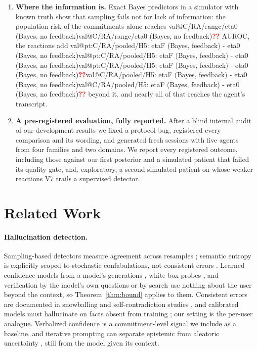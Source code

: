 \documentclass[10pt,a4paper,twocolumn]{article}
\makeatletter
\newcommand{\val}[1]{\ifcsname val@#1\endcsname\csname val@#1\endcsname\else\textcolor{red}{\textbf{??}}\fi}
\newcommand{\pt}[1]{\ifcsname val@pt:#1\endcsname\val{pt:#1}\else\val{#1}\fi}
\newif\iffinal \finaltrue
\newcommand{\chk}[1]{\iffinal#1\else\textcolor{blue}{#1}\fi}
\makeatother
\begin{document}
\begin{enumerate}
and \pt{PC/user_dependent/pooled/auroc_disagreement} for resample
disagreement. \chk{After the registered V6 picker failed, an amendment (H9)
tested V7 as the picker: one question about its riskiest commitment removes
\val{CL7/reduction/V7 posterior@1}\% of the agent's wrong confident
user-specific commitments, and beats a random question
(\val{CL7/d/wcu/H9: V7 posterior@1 - random@1} per session).}
\item \textbf{Where the information is.} Exact Bayes predictors in a
simulator with known truth show that sampling fails not for lack of
information: the population risk of the commitments alone reaches
\val{C/RA/range/eta0 (Bayes, no feedback)} AUROC, the reactions add
\pt{C/RA/pooled/H5: etaF (Bayes, feedback) - eta0 (Bayes, no feedback)}
beyond it, and nearly all of that reaches the agent's transcript.
\item \textbf{A pre-registered evaluation, fully reported.} After a blind
internal audit of our development results we fixed a protocol bug,
registered every comparison and its wording, and generated fresh sessions
with five agents from four families and two domains. We report every
registered outcome, including those against our first posterior and a
simulated patient that failed its quality gate, and, exploratory, a second
simulated patient on whose weaker reactions V7 trails a supervised detector.
\end{enumerate}

\section{Related Work}

\paragraph{Hallucination detection.} Sampling-based detectors measure
agreement across resamples \citep{manakul2023selfcheckgpt,kuhn2023semantic,farquhar2024detecting};
semantic entropy is explicitly scoped to stochastic confabulations, not
consistent errors \citep{farquhar2024detecting}. Learned confidence models
from a model's generations \citep{ulmer2024apricot}, white-box probes
\citep{azaria2023internal,chen2024inside,kossen2024sep}, and verification by
the model's own questions \citep{dhuliawala2024cove} or by search
\citep{wei2024longform} use nothing about the user beyond the context, so
Theorem~\ref{thm:bound} applies to them. Consistent errors are documented
in snowballing \citep{zhang2024snowball} and self-contradiction studies
\citep{mundler2024selfcontradictory}, and calibrated models must
hallucinate on facts absent from training \citep{kalai2024calibrated}; our
setting is the per-user analogue. Verbalized confidence
\citep{kadavath2022language,tian2023just,xiong2024can} is a commitment-level
signal we include as a baseline, and iterative prompting can separate
epistemic from aleatoric uncertainty \citep{yadkori2024believe}, still from
the model given its context.
\end{document}
